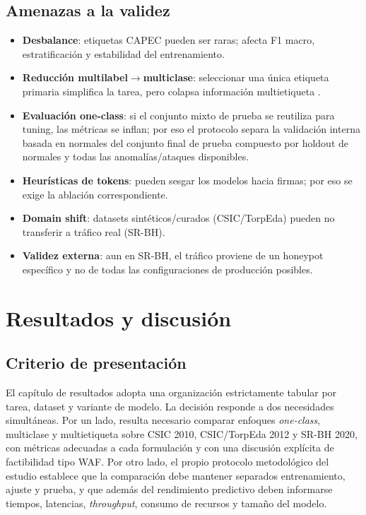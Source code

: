 \documentclass[12pt,oneside]{report}
\begin{document}
\section{Amenazas a la validez}
\begin{itemize}[leftmargin=*]
  \item \textbf{Desbalance}: etiquetas CAPEC pueden ser raras; afecta F1 macro, estratificación y estabilidad del entrenamiento.
  \item \textbf{Reducción multilabel$\rightarrow$multiclase}: seleccionar una única etiqueta primaria simplifica la tarea, pero colapsa información multietiqueta \cite{capec_schema_docs,capec_schema_desc,owasp_risk_rating}.
  \item \textbf{Evaluación one-class}: si el conjunto mixto de prueba se reutiliza para tuning, las métricas se inflan; por eso el protocolo separa la validación interna basada en normales del conjunto final de prueba compuesto por holdout de normales y todas las anomalías/ataques disponibles.
  \item \textbf{Heurísticas de tokens}: pueden sesgar los modelos hacia firmas; por eso se exige la ablación correspondiente.
  \item \textbf{Domain shift}: datasets sintéticos/curados (CSIC/TorpEda) pueden no transferir a tráfico real (SR-BH).
  \item \textbf{Validez externa}: aun en SR-BH, el tráfico proviene de un honeypot específico y no de todas las configuraciones de producción posibles.
\end{itemize}

\chapter{Resultados y discusión}

\section{Criterio de presentación}
El capítulo de resultados adopta una organización estrictamente tabular por tarea, dataset y variante de modelo. La decisión responde a dos necesidades simultáneas. Por un lado, resulta necesario comparar enfoques \textit{one-class}, multiclase y multietiqueta sobre CSIC 2010, CSIC/TorpEda 2012 y SR-BH 2020, con métricas adecuadas a cada formulación y con una discusión explícita de factibilidad tipo WAF. Por otro lado, el propio protocolo metodológico del estudio establece que la comparación debe mantener separados entrenamiento, ajuste y prueba, y que además del rendimiento predictivo deben informarse tiempos, latencias, \textit{throughput}, consumo de recursos y tamaño del modelo.\
\end{document}
